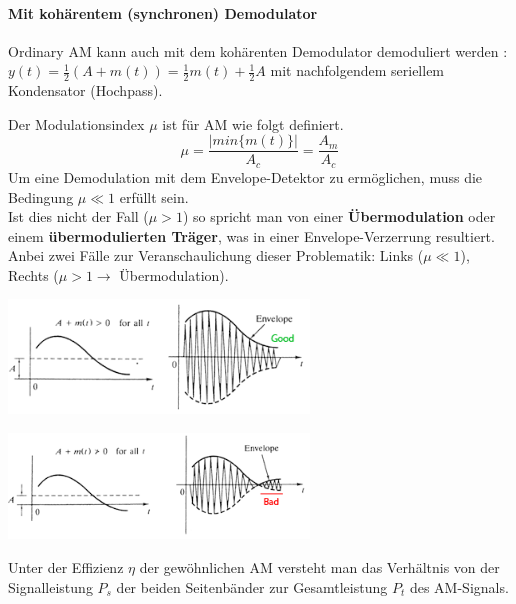 \paragraph{Mit kohärentem (synchronen) Demodulator}
Ordinary AM kann auch mit dem kohärenten Demodulator demoduliert werden
:
$y(t) = \frac12 (A + m(t)) = \frac12 m(t) + \frac12 A$ mit nachfolgendem
seriellem Kondensator (Hochpass).


Der Modulationsindex $\mu$ ist für AM wie folgt definiert.
$$\mu = \frac{|min\{m(t)\}|}{A_c} = \frac{A_m}{A_c} $$
Um eine Demodulation mit dem Envelope-Detektor zu ermöglichen, muss die Bedingung 
\textbf{$\mu \ll 1$} erfüllt sein. \\
Ist dies nicht der Fall (\textbf{$\mu > 1$}) so spricht man von einer \textbf{Übermodulation} oder
einem  \textbf{übermodulierten Träger}, was in einer Envelope-Verzerrung resultiert. \\
Anbei zwei Fälle zur Veranschaulichung dieser Problematik: Links ($\mu \ll 1$), Rechts ($\mu > 1
\rightarrow $ Übermodulation).

\begin{minipage}[t][2.3cm][c]{9.5cm}
	\begin{center}
      \includegraphics[width=8cm]{bilder/am_oam_enveloppeGood.png}
	\end{center}
\end{minipage}
\begin{minipage}[t][2.3cm][c]{9.5cm}
    \begin{center}
    	\includegraphics[width=8cm]{bilder/am_oam_enveloppeBad.png}
	\end{center}
\end{minipage}

Unter der Effizienz $ \eta $ der gewöhnlichen AM versteht man das Verhältnis von der Signalleistung
$P_s$ der beiden Seitenbänder zur Gesamtleistung $P_t$ des AM-Signals.

